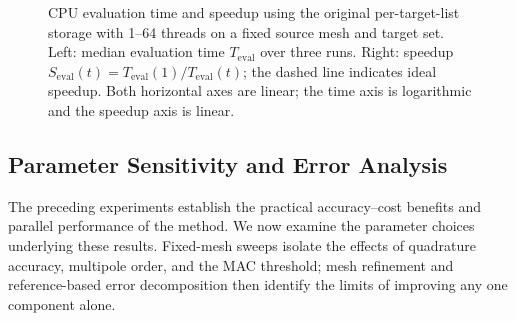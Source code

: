 \documentclass[a4paper,pdflatex,sn-mathphys-num]{sn-jnl}
\theoremstyle{thmstyleone}
\begin{document}
\begin{figure}[!htbp]
\centering
{}

\caption{CPU evaluation time and speedup using the original
per-target-list storage with 1--64 threads on a fixed source
mesh and target set. Left: median evaluation time
$T_{\mathrm{eval}}$ over three runs.
Right: speedup
$S_{\mathrm{eval}}(t)=T_{\mathrm{eval}}(1)/T_{\mathrm{eval}}(t)$;
the dashed line indicates ideal speedup.
Both horizontal axes are linear; the time axis is logarithmic
and the speedup axis is linear.}
\label{fig:thread_scaling}
\end{figure}

\FloatBarrier

\subsection{Parameter Sensitivity and Error Analysis}
\label{sec:accuracy_parameters}

The preceding experiments establish the practical accuracy--cost benefits and parallel performance of the method. We now examine the parameter choices underlying these results. Fixed-mesh sweeps isolate the effects of quadrature accuracy, multipole order, and the MAC threshold; mesh refinement and reference-based error decomposition then identify the limits of improving any one component alone.
\end{document}
